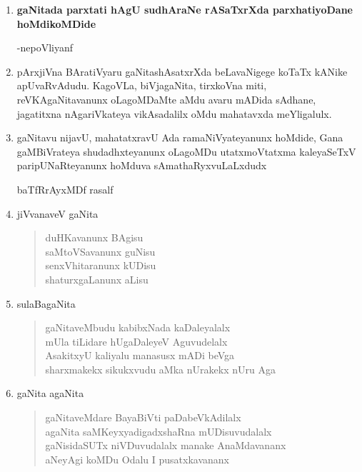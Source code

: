 \begin{enumerate}[\rm 1)]
\item \textbf{gaNitada parxtati hAgU sudhAraNe rASaTxrXda parxhatiyoDane hoMdikoMDide}
\begin{flushright}
-nepoVliyanf
\end{flushright}

\item pArxjiVna BAratiVyaru gaNitashAsatxrXda beLavaNigege koTaTx kANike apUvaRvAdudu. KagoVLa, biVjagaNita, tirxkoVna miti, reVKAgaNitavanunx oLagoMDaMte aMdu avaru mADida sAdhane, jagatitxna nAgariVkateya vikAsadalilx oMdu mahatavxda meYligalulx.

\item gaNitavu nijavU, mahatatxravU Ada ramaNiVyateyanunx hoMdide, Gana gaMBiVrateya shudadhxteyanunx oLagoMDu utatxmoVtatxma kaleyaSeTxV paripUNaRteyanunx hoMduva sAmathaRyxvuLaLxdudx 
\begin{flushright}
baTfRrAyxMDf rasalf
\end{flushright}

\item jiVvanaveV gaNita
\begin{center}
\begin{verse}
duHKavanunx BAgisu\\
saMtoVSavanunx guNisu\\
senxVhitaranunx kUDisu\\
shaturxgaLanunx aLisu
\end{verse}
\end{center}

\item sulaBagaNita
\begin{center} 
\begin{verse}
gaNitaveMbudu kabibxNada kaDaleyalalx\\
mUla tiLidare hUgaDaleyeV Aguvudelalx\\
AsakitxyU kaliyalu manasusx mADi beVga\\
sharxmakekx sikukxvudu aMka nUrakekx nUru Aga
\end{verse}
\end{center}

\item gaNita agaNita
\begin{center} 
\begin{verse}
gaNitaveMdare BayaBiVti paDabeVkAdilalx\\
agaNita saMKeyxyadigadxshaRna mUDisuvudalalx\\
gaNisidaSUTx niVDuvudalalx manake AnaMdavananx\\
aNeyAgi koMDu Odalu I pusatxkavananx
\end{verse}
\end{center}


\end{enumerate}
